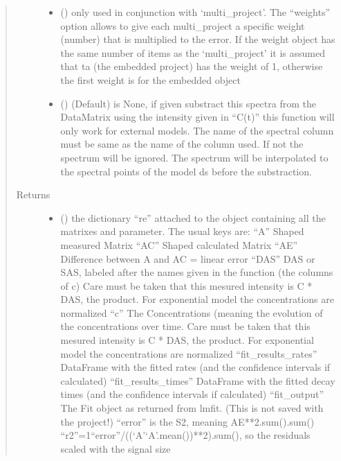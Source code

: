 \documentclass[letterpaper,10pt,english]{sphinxmanual}
\begin{document}
\begin{fulllineitems}
\begin{fulllineitems}
\begin{quote}
\begin{description}
\begin{itemize}
\item {} 
 (\sphinxstyleliteralemphasis{\sphinxupquote{, }}) \textendash{} only used in conjunction with ‘multi\_project’. The “weights” option allows to
give each multi\_project a specific weight (number) that is multiplied to the error.
If the weight object has the same number of items as the ‘multi\_project’ it is assumed
that ta (the embedded project) has the weight of 1, otherwise the first weight is for the
embedded object

\item {} 
 (\sphinxstyleliteralemphasis{\sphinxupquote{, }}) \textendash{} (Default) is None, if given substract this spectra from the DataMatrix using the intensity
given in “C(t)” this function will only work for external models. The name of the spectral column
must be same as the name of the column used. If not the spectrum will be ignored. The spectrum will
be interpolated to the spectral points of the model ds before the substraction.

\end{itemize}

\item[{Returns}] \leavevmode
\begin{itemize}
\item {} 
 () \textendash{} the dictionary “re” attached to the object containing all the matrixes and parameter.
The usual keys are:
“A” Shaped measured Matrix
“AC” Shaped calculated Matrix
“AE” Difference between A and AC = linear error
“DAS” DAS or SAS, labeled after the names given in the function (the columns of c) Care must be taken that this mesured intensity is C * DAS, the product. For exponential model the concentrations are normalized
“c” The Concentrations (meaning the evolution of the concentrations over time. Care must be taken that this mesured intensity is C * DAS, the product. For exponential model the concentrations are normalized
“fit\_results\_rates” DataFrame with the fitted rates (and the confidence intervals if calculated)
“fit\_results\_times” DataFrame with the fitted decay times (and the confidence intervals if calculated)
“fit\_output” The Fit object as returned from lmfit. (This is not saved with the project!)
“error” is the S2, meaning AE**2.sum().sum()
“r2”=1\sphinxhyphen{}“error”/((‘A’\sphinxhyphen{}‘A’.mean())**2).sum(), so the residuals scaled with the signal size


\end{itemize}
\end{description}
\end{quote}
\end{fulllineitems}
\end{fulllineitems}
\end{document}
